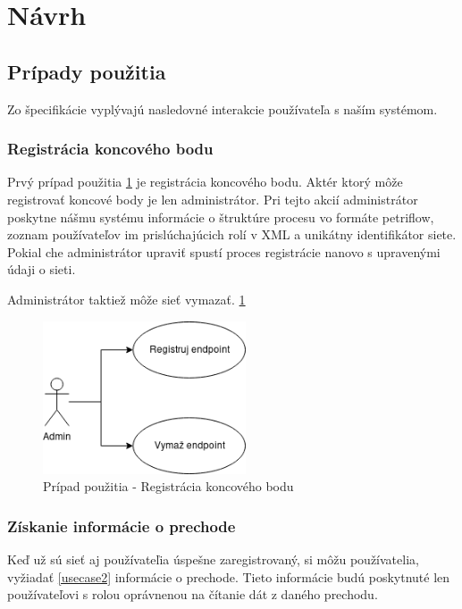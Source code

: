   

\section{Návrh} 



 

\subsection{Prípady použitia}
Zo špecifikácie vyplývajú nasledovné interakcie používateľa s naším systémom.

\subsubsection{Registrácia koncového bodu}
Prvý prípad použitia \ref{usecase1} je registrácia koncového bodu. Aktér ktorý môže registrovať koncové body je len administrátor. Pri tejto akcií administrátor poskytne nášmu systému informácie o štruktúre procesu vo formáte petriflow, zoznam používateľov im prislúchajúcich rolí v XML a unikátny identifikátor siete. Pokial che administrátor upraviť spustí proces registrácie nanovo s upravenými údaji o sieti.

Administrátor taktiež môže sieť vymazať. \ref{usecase1}
\begin{figure}[!htbp]
	\centering
	\includegraphics[width=6cm]{img/dp_usecase_1_register.png}
	\caption{Prípad použitia - Registrácia koncového bodu}
	\label{usecase1}
\end{figure} 

\subsubsection{Získanie informácie o prechode}
Keď už sú sieť aj používateľia úspešne zaregistrovaný, si môžu používatelia, vyžiadať \ref{usecase2} informácie o prechode. Tieto informácie budú poskytnuté len používateľovi s rolou oprávnenou na čítanie dát z daného prechodu.

